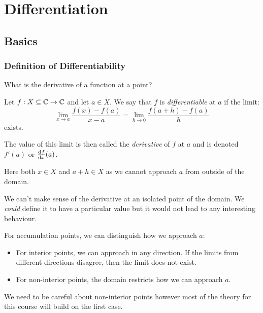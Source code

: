 \documentclass[../main.tex]{subfiles}
\begin{document}
\chapter{Differentiation}
\section{Basics}
\subsection{Definition of Differentiability}
What is the derivative of a function at a point?
\begin{definition}[Differentiable]
  Let $f: X \subseteq \mathbb{C} \to \mathbb{C}$ and let $a \in X$.
  We say that $f$ is \textit{differentiable} at $a$ if the limit:
  \[
    \lim_{x \to a} \frac{f(x) - f(a)}{x - a} = \lim_{h \to 0} \frac{f(a + h) - f(a)}{h}
  \]
  exists.

  The value of this limit is then called the \textit{derivative} of $f$ at $a$ and is denoted $f'(a)$ or $\deriv{f}{x}(a)$.
\end{definition}
\begin{remark}[Note]
  Here both $x \in X$ and $a + h \in X$ as we cannot approach $a$ from outside of the domain.
\end{remark}
\begin{remark}
  We can't make sense of the derivative at an isolated point of the domain.
  We \textit{could} define it to have a particular value but it would not lead to any interesting behaviour.
\end{remark}
For accumulation points, we can distinguish how we approach $a$:
\begin{itemize}
  \item For interior points, we can approach in any direction.
    If the limits from different directions disagree, then the limit does not exist.
  \item For non-interior points, the domain restricts how we can approach $a$.
\end{itemize}
We need to be careful about non-interior points however most of the theory for this course will build on the first case.
\end{document}
